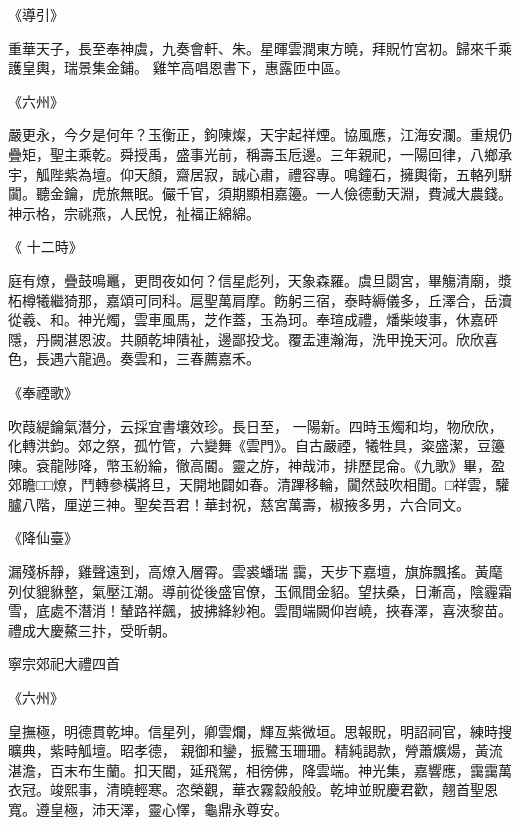 \begin{pinyinscope}
 《導引》



 重華天子，長至奉神虞，九奏會軒、朱。星暉雲潤東方曉，拜貺竹宮初。歸來千乘護皇輿，瑞景集金鋪。
 雞竿高唱恩書下，惠露匝中區。



 《六州》



 嚴更永，今夕是何年？玉衡正，鉤陳燦，天宇起祥煙。協風應，江海安瀾。重規仍疊矩，聖主乘乾。舜授禹，盛事光前，稱壽玉卮邊。三年親祀，一陽回律，八鄉承宇，觚陛紫為壇。仰天顏，齋居寂，誠心肅，禮容專。鳴鐘石，擁輿衛，五輅列駢闐。聽金鑰，虎旅無眠。儼千官，須期顯相嘉籩。一人儉德動天淵，費減大農錢。神示格，宗祧燕，人民悅，祉福正綿綿。



 《
 十二時》



 庭有燎，疊鼓鳴鼉，更問夜如何？信星彪列，天象森羅。虞旦閟宮，畢觴清廟，漿柘樽犧繼猗那，嘉頌可同科。扈聖萬肩摩。飭躬三宿，泰畤縟儀多，丘澤合，岳瀆從羲、和。神光燭，雲車風馬，芝作蓋，玉為珂。奉瑄成禮，燔柴竣事，休嘉砰隱，丹闕湛恩波。共願乾坤隤祉，邊鄙投戈。覆盂連瀚海，洗甲挽天河。欣欣喜色，長遇六龍過。奏雲和，三春薦嘉禾。



 《奉禋歌》



 吹葭緹鑰氣潛分，云採宜書壤效珍。長日至，
 一陽新。四時玉燭和均，物欣欣，化轉洪鈞。郊之祭，孤竹管，六變舞《雲門》。自古嚴禋，犧牲具，粢盛潔，豆籩陳。袞龍陟降，幣玉紛綸，徹高閽。靈之斿，神哉沛，排歷昆侖。《九歌》畢，盈郊瞻□□燎，鬥轉參橫將旦，天開地闢如春。清蹕移輪，闐然鼓吹相聞。□祥雲，驩臚八階，厘逆三神。聖矣吾君！華封祝，慈宮萬壽，椒掖多男，六合同文。



 《降仙臺》



 漏殘柝靜，雞聲遠到，高燎入層霄。雲裘蟠瑞
 靄，天步下嘉壇，旗旆飄搖。黃麾列仗貔貅整，氣壓江潮。導前從後盛官僚，玉佩間金貂。望扶桑，日漸高，陰霾霜雪，底處不潛消！輦路祥飆，披拂絳紗袍。雲間端闕仰岧嶢，挾春澤，喜浹黎苗。禮成大慶鰲三抃，受昕朝。



 寧宗郊祀大禮四首



 《六州》



 皇撫極，明德貫乾坤。信星列，卿雲爛，輝亙紫微垣。思報貺，明詔祠官，練時搜曠典，紫畤觚壇。昭孝德，
 親御和鑾，振鷺玉珊珊。精純謁款，膋蕭爌煬，黃流湛澹，百末布生蘭。扣天閽，延飛駕，相徬佛，降雲端。神光集，嘉響應，靄靄萬衣冠。竣熙事，清曉輕寒。恣榮觀，華衣霧縠般般。乾坤並貺慶君歡，翹首聖恩寬。遵皇極，沛天澤，靈心懌，龜鼎永尊安。




\end{pinyinscope}
